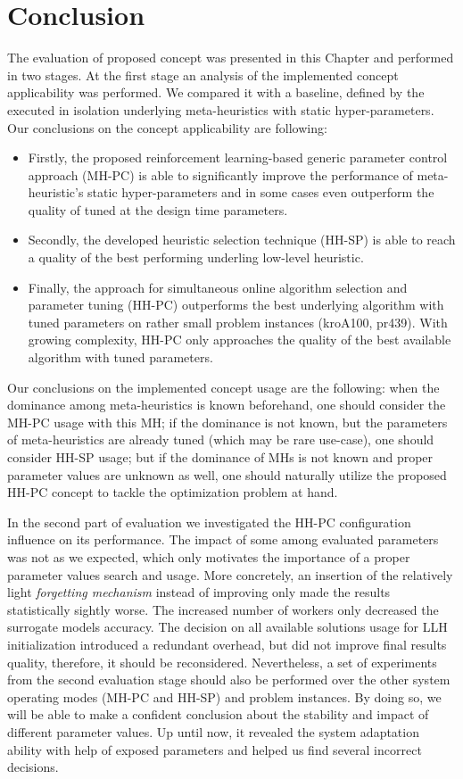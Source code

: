 \section{Conclusion}\label{eval: conclution}
The evaluation of proposed concept was presented in this Chapter and performed in two stages. At the first stage an analysis of the implemented concept applicability was performed. We compared it with a baseline, defined by the executed in isolation underlying meta-heuristics with static hyper-parameters. Our conclusions on the concept applicability are following:
\begin{itemize}
	\item Firstly, the proposed reinforcement learning-based generic parameter control approach (MH-PC) is able to significantly improve the performance of meta-heuristic's static hyper-parameters and in some cases even outperform the quality of tuned at the design time parameters.
	
	\item Secondly, the developed heuristic selection technique (HH-SP) is able to reach a quality of the best performing underling low-level heuristic. 
	
	\item Finally, the approach for simultaneous online algorithm selection and parameter tuning (HH-PC) outperforms the best underlying algorithm with tuned parameters on rather small problem instances (kroA100, pr439). With growing complexity, HH-PC only approaches the quality of the best available algorithm with tuned parameters.
\end{itemize}

Our conclusions on the implemented concept usage are the following: when the dominance among meta-heuristics is known beforehand, one should consider the MH-PC usage with this MH; if the dominance is not known, but the parameters of meta-heuristics are already tuned (which may be rare use-case), one should consider HH-SP usage; but if the dominance of MHs is not known and proper parameter values are unknown as well, one should naturally utilize the proposed HH-PC concept to tackle the optimization problem at hand.


In the second part of evaluation we investigated the HH-PC configuration influence on its performance. The impact of some among evaluated parameters was not as we expected, which only motivates the importance of a proper parameter values search and usage. More concretely, an insertion of the relatively light \emph{forgetting mechanism} instead of improving only made the results statistically sightly worse. The increased number of workers only decreased the surrogate models accuracy. The decision on all available solutions usage for LLH initialization introduced a redundant overhead, but did not improve final results quality, therefore, it should be reconsidered. Nevertheless, a set of experiments from the second evaluation stage should also be performed over the other system operating modes (MH-PC and HH-SP) and problem instances. By doing so, we will be able to make a confident conclusion about the stability and impact of different parameter values. Up until now, it revealed the system adaptation ability with help of exposed parameters and helped us find several incorrect decisions.